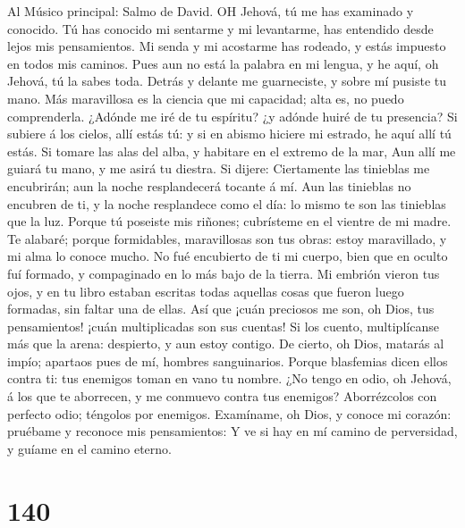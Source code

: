  Al Músico principal: Salmo de David. OH Jehová, tú me has
examinado y conocido.  Tú has conocido mi sentarme y mi
levantarme, has entendido desde lejos mis pensamientos.  Mi
senda y mi acostarme has rodeado, y estás impuesto en todos mis caminos.
 Pues aun no está la palabra en mi lengua, y he aquí, oh
Jehová, tú la sabes toda.  Detrás y delante me guarneciste,
y sobre mí pusiste tu mano.  Más maravillosa es la ciencia
que mi capacidad; alta es, no puedo comprenderla.  ¿Adónde
me iré de tu espíritu? ¿y adónde huiré de tu presencia?  Si
subiere á los cielos, allí estás tú: y si en abismo hiciere mi estrado,
he aquí allí tú estás.  Si tomare las alas del alba, y
habitare en el extremo de la mar,  Aun allí me guiará tu
mano, y me asirá tu diestra.  Si dijere: Ciertamente las
tinieblas me encubrirán; aun la noche resplandecerá tocante á mí.
 Aun las tinieblas no encubren de ti, y la noche
resplandece como el día: lo mismo te son las tinieblas que la luz.
 Porque tú poseiste mis riñones; cubrísteme en el vientre
de mi madre.  Te alabaré; porque formidables, maravillosas
son tus obras: estoy maravillado, y mi alma lo conoce mucho.
 No fué encubierto de ti mi cuerpo, bien que en oculto fuí
formado, y compaginado en lo más bajo de la tierra.  Mi
embrión vieron tus ojos, y en tu libro estaban escritas todas aquellas
cosas que fueron luego formadas, sin faltar una de ellas. 
Así que ¡cuán preciosos me son, oh Dios, tus pensamientos! ¡cuán
multiplicadas son sus cuentas!  Si los cuento,
multiplícanse más que la arena: despierto, y aun estoy contigo.
 De cierto, oh Dios, matarás al impío; apartaos pues de mí,
hombres sanguinarios.  Porque blasfemias dicen ellos contra
ti: tus enemigos toman en vano tu nombre.  ¿No tengo en
odio, oh Jehová, á los que te aborrecen, y me conmuevo contra tus
enemigos?  Aborrézcolos con perfecto odio; téngolos por
enemigos.  Examíname, oh Dios, y conoce mi corazón:
pruébame y reconoce mis pensamientos:  Y ve si hay en mí
camino de perversidad, y guíame en el camino eterno.

\hypertarget{section-139}{%
\section{140}\label{section-139}}

